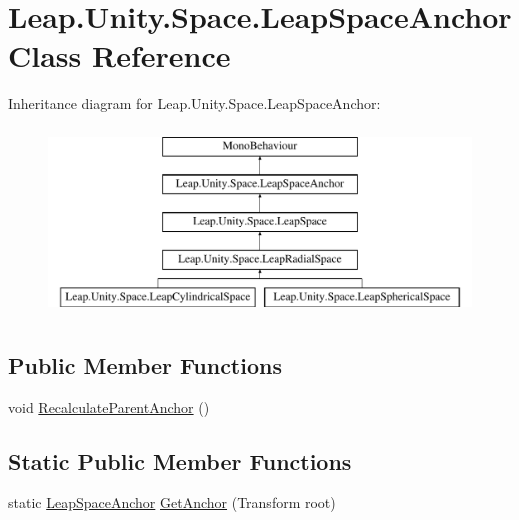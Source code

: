 \hypertarget{class_leap_1_1_unity_1_1_space_1_1_leap_space_anchor}{}\section{Leap.\+Unity.\+Space.\+Leap\+Space\+Anchor Class Reference}
\label{class_leap_1_1_unity_1_1_space_1_1_leap_space_anchor}
Inheritance diagram for Leap.\+Unity.\+Space.\+Leap\+Space\+Anchor\+:\begin{figure}[H]
\begin{center}
\leavevmode
\includegraphics[height=5.000000cm]{class_leap_1_1_unity_1_1_space_1_1_leap_space_anchor}
\end{center}
\end{figure}
\subsection*{Public Member Functions}
\begin{DoxyCompactItemize}
\item 
void \mbox{\hyperlink{class_leap_1_1_unity_1_1_space_1_1_leap_space_anchor_a1af147f4c4a59aec2552652d7eb6a0f1}{Recalculate\+Parent\+Anchor}} ()
\end{DoxyCompactItemize}
\subsection*{Static Public Member Functions}
\begin{DoxyCompactItemize}
\item 
static \mbox{\hyperlink{class_leap_1_1_unity_1_1_space_1_1_leap_space_anchor}{Leap\+Space\+Anchor}} \mbox{\hyperlink{class_leap_1_1_unity_1_1_space_1_1_leap_space_anchor_a46df24f040b141165265e8bef97fb1d5}{Get\+Anchor}} (Transform root)
\end{DoxyCompactItemize}

